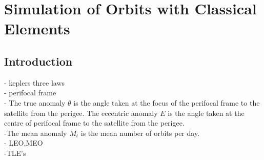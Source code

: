 \documentclass[Space3_Assign1.tex]{subfiles}
\begin{document}
\section{Simulation of Orbits with Classical Elements}
\subsection{Introduction}
- keplers three laws\\
- perifocal frame\\
- The true anomaly $\theta$ is the angle taken at the focus of the perifocal frame to the satellite from the perigee. The eccentric anomaly $\textit{E}$ is the angle taken at the centre of perifocal frame to the satellite from the perigee.\\
-The mean anomaly \textit{$M_t$} is the mean number of orbits per day.\\
- LEO,MEO\\
-TLE's \\
\end{document}
